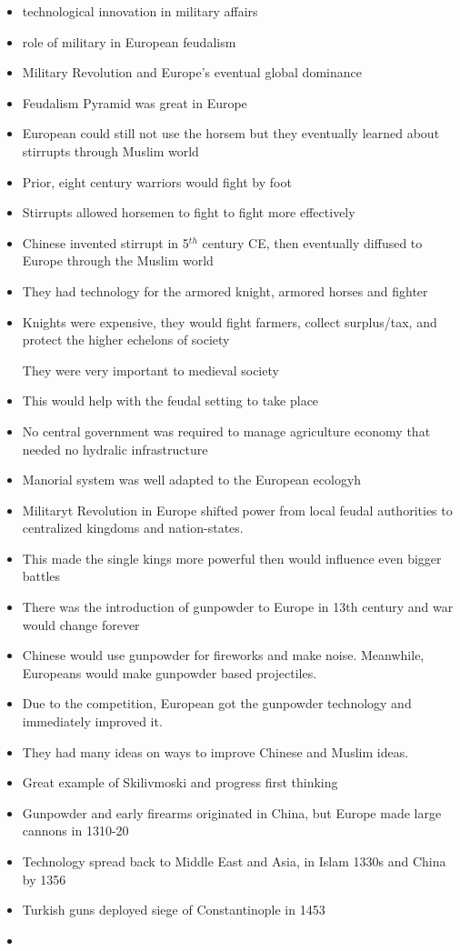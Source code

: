 \documentclass{article}
\begin{document}
\begin{itemize}
  \item technological innovation in military affairs
  \item role of military in European feudalism
  \item Military Revolution and Europe's eventual global dominance
  \item Feudalism Pyramid was great in Europe
  \item European could still not use the horsem but they eventually learned about stirrupts through
    Muslim world
  \item Prior, eight century warriors would fight by foot
  \item Stirrupts allowed horsemen to fight to fight more effectively
  \item Chinese invented stirrupt in 5$^{th}$ century CE,
    then eventually diffused to Europe through the Muslim world
  \item They had technology for the armored knight, armored horses and fighter
  \item Knights were expensive, they would fight farmers, collect surplus/tax, and protect the
    higher echelons of society

    They were very important to medieval society
  \item This would help with the feudal setting to take place
  \item No central government was required to manage agriculture
    economy that needed no hydralic infrastructure
  \item Manorial system was well adapted to the European ecologyh
  \item Militaryt Revolution in Europe shifted power from local feudal authorities
    to centralized kingdoms and nation-states.
  \item This made the single kings more powerful then would influence even bigger
    battles
  \item There was the introduction of gunpowder to Europe in 13th century and
    war would change forever
  \item Chinese would use gunpowder for fireworks and make noise. Meanwhile,
    Europeans would make gunpowder based projectiles.
  \item Due to the competition, European got the gunpowder technology and
    immediately improved it.
  \item They had many ideas on ways to improve Chinese and Muslim ideas.
  \item Great example of Skilivmoski and progress first thinking
  \item Gunpowder and early firearms originated in China,
    but Europe made large cannons in 1310-20
  \item Technology spread back to Middle East and Asia,
    in Islam 1330s and China by 1356
  \item Turkish guns deployed siege of Constantinople in 1453
  \item
\end{itemize}
\end{document}

